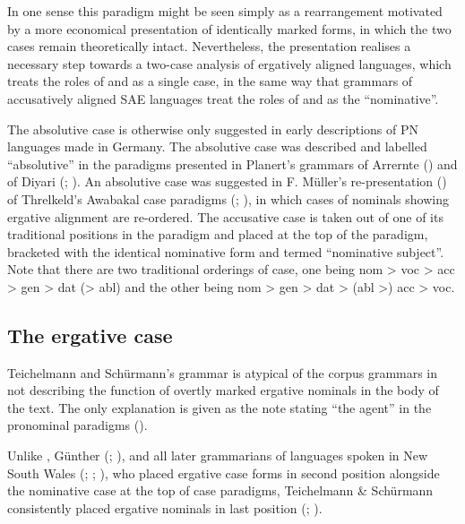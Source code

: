 In one sense this paradigm might be seen simply as a rearrangement motivated by a more economical presentation of identically marked forms, in which the two cases remain theoretically intact. Nevertheless, the presentation realises a necessary step towards a two-case analysis of ergatively aligned languages, which treats the roles of  and  as a single case, in the same way that grammars of accusatively aligned SAE languages treat the roles of  and  as the ``nominative''.

The absolutive case is otherwise only suggested in early descriptions of PN languages made in Germany. The absolutive case was described and labelled “absolutive” in the paradigms presented in Planert’s grammars of Arrernte (\citeyear{planert_australische_1907}) and of Diyari (\citeyear{planert_australische_1908}; ). An absolutive case was suggested in F. Müller’s re-presentation (\citeyear[19]{muller_grundris_1882}) of Threlkeld’s Awabakal case paradigms (\citeyear[13--16]{threlkeld_australian_1834}; ), in which cases of nominals showing ergative alignment are re-ordered. The accusative case is taken out of one of its traditional positions in the paradigm and placed at the top of the paradigm, bracketed with the identical nominative form and termed ``nominative subject''. Note that there are two traditional orderings of case, one being nom > voc > acc > gen > dat (> abl) and the other being nom > gen > dat > (abl >) acc > voc.

\subsection{The ergative case}
\label{sec:key:5.4.2}

Teichelmann and Schürmann’s grammar is atypical of the corpus grammars in not describing the function of overtly marked ergative nominals in the body of the text. The only explanation is given as the note stating “the agent” in the pronominal paradigms ().

Unlike \citet{threlkeld_australian_1834}, Günther (\citeyear{gunther_native_1838}; \citeyear{gunther_lecture_1840}), and all later grammarians of languages spoken in New South Wales (\citealt{ridley_kamilaroi_1866}; \citeyear{ridley_kamilaroi_1875}; \citealt{livingstone_grammar_1892}), who placed ergative case forms in second position alongside the nominative case at the top of case paradigms, Teichelmann \& Schürmann consistently placed ergative nominals in last position (; ).

